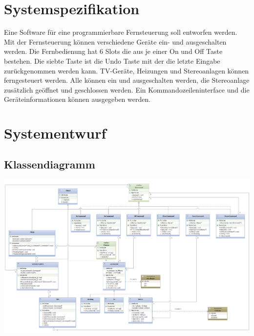 \documentclass[12pt,a4paper]{article}
\begin{document}
\section{Systemspezifikation}
Eine Software für eine programmierbare Fernsteuerung soll entworfen werden. Mit der Fernsteuerung können verschiedene Geräte ein- und ausgeschalten werden. Die Fernbedienung hat 6 Slots die aus je einer On und Off Taste bestehen. Die siebte Taste ist die Undo Taste mit der die letzte Eingabe zurückgenommen werden kann. TV-Geräte, Heizungen und Stereoanlagen können ferngesteuert werden. Alle können ein und ausgeschalten werden, die Stereoanlage zusätzlich geöffnet und geschlossen werden. Ein Kommandozeileninterface und die Geräteinformationen können ausgegeben werden.
\\


\newpage
\section {Systementwurf}

\subsection {Klassendiagramm}

\includegraphics[angle=90,scale=0.50] {../Klassendiagramm.png}

\newpage
\end{document}
